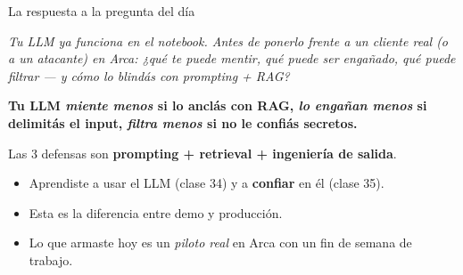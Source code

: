 \documentclass[aspectratio=169, 11pt]{beamer}
\begin{document}
\begin{frame}[shrink]{La respuesta a la pregunta del día}
  \vspace{4pt}
  \begin{tcolorbox}[colback=arcaDark, colframe=arcaDark, sharp corners,
    boxrule=0pt, left=10pt, right=10pt, top=5pt, bottom=5pt]
    {\footnotesize\color{white}\itshape
    Tu LLM ya funciona en el notebook. Antes de ponerlo frente a un cliente real
    (o a un atacante) en Arca: ¿qué te puede mentir, qué puede ser engañado, qué
    puede filtrar --- y cómo lo blindás con prompting + RAG?\par}
  \end{tcolorbox}
  \vspace{8pt}
  \begin{tcolorbox}[colback=arcaRed!8, colframe=arcaRed, leftrule=3pt,
    boxrule=0pt, sharp corners, left=8pt, right=8pt, top=6pt, bottom=6pt]
    {\small\color{arcaDark}\bfseries
    Tu LLM \emph{miente menos} si lo anclás con RAG,
    \emph{lo engañan menos} si delimitás el input,
    \emph{filtra menos} si no le confiás secretos.\par
    \vspace{2pt}
    Las 3 defensas son \textbf{prompting + retrieval + ingeniería de salida}.}
  \end{tcolorbox}
  \vspace{4pt}
  \begin{itemize}\setlength{\itemsep}{2pt}
    \footnotesize
    \item Aprendiste a usar el LLM (clase 34) y a \textbf{confiar} en él (clase 35).
    \item Esta es la diferencia entre demo y producción.
    \item Lo que armaste hoy es un \emph{piloto real} en Arca con un fin de semana de trabajo.
  \end{itemize}
\end{frame}
\end{document}
